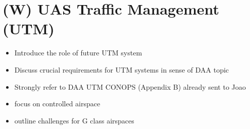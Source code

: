 \section{(W) UAS Traffic Management (UTM)}\label{sec:UTM}
\begin{itemize}
    \item Introduce the role of future UTM system
    \item Discuss crucial requirements for UTM systems in sense of DAA topic
    \item Strongly refer to DAA UTM CONOPS (Appendix B) already sent to Joao
    \item focus on controlled airspace
    \item outline challenges for G class airspaces
\end{itemize}


